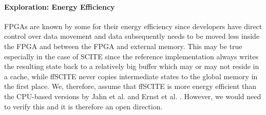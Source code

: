 \paragraph{Exploration: Energy Efficiency}
\acp{FPGA} are known by some for their energy efficiency \cite{betkaoui2010comparing} since developers have direct control over data movement and data subsequently needs to be moved less inside the \ac{FPGA} and between the \ac{FPGA} and external memory. This may be true especially in the case of \ac{SCITE} since the reference implementation always writes the resulting state back to a relatively big buffer which may or may not reside in a cache, while \ac{ffSCITE} never copies intermediate states to the global memory in the first place. We, therefore, assume that \ac{ffSCITE} is more energy efficient than the CPU-based versions by Jahn et al. \cite{tree2016} and Ernst et al. \cite{ernst2020Performance}. However, we would need to verify this and it is therefore an open direction.